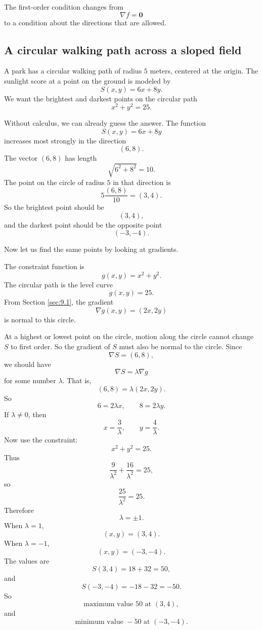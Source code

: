 The first-order condition changes from
\[
    \nabla f=\mathbf 0
\]
to a condition about the directions that are allowed.

\subsection{A circular walking path across a sloped field}

A park has a circular walking path of radius \(5\) meters, centered at the origin.  The
sunlight score at a point on the ground is modeled by
\[
    S(x,y)=6x+8y.
\]
We want the brightest and darkest points on the circular path
\[
    x^2+y^2=25.
\]

Without calculus, we can already guess the answer.  The function
\[
    S(x,y)=6x+8y
\]
increases most strongly in the direction
\[
    (6,8).
\]
The vector \((6,8)\) has length
\[
    \sqrt{6^2+8^2}=10.
\]
The point on the circle of radius \(5\) in that direction is
\[
    5\frac{(6,8)}{10}=(3,4).
\]
So the brightest point should be
\[
    (3,4),
\]
and the darkest point should be the opposite point
\[
    (-3,-4).
\]

Now let us find the same points by looking at gradients.

The constraint function is
\[
    g(x,y)=x^2+y^2.
\]
The circular path is the level curve
\[
    g(x,y)=25.
\]
From Section \ref{sec:9.1}, the gradient
\[
    \nabla g(x,y)=(2x,2y)
\]
is normal to this circle.

At a highest or lowest point on the circle, motion along the circle cannot change
\(S\) to first order.  So the gradient of \(S\) must also be normal to the circle.  Since
\[
    \nabla S=(6,8),
\]
we should have
\[
    \nabla S=\lambda \nabla g
\]
for some number \(\lambda\).  That is,
\[
    (6,8)=\lambda(2x,2y).
\]
So
\[
    6=2\lambda x,
    \qquad
    8=2\lambda y.
\]
If \(\lambda\ne0\), then
\[
    x=\frac{3}{\lambda},
    \qquad
    y=\frac{4}{\lambda}.
\]
Now use the constraint:
\[
    x^2+y^2=25.
\]
Thus
\[
    \frac{9}{\lambda^2}+\frac{16}{\lambda^2}=25,
\]
so
\[
    \frac{25}{\lambda^2}=25.
\]
Therefore
\[
    \lambda=\pm1.
\]
When \(\lambda=1\),
\[
    (x,y)=(3,4).
\]
When \(\lambda=-1\),
\[
    (x,y)=(-3,-4).
\]
The values are
\[
    S(3,4)=18+32=50,
\]
and
\[
    S(-3,-4)=-18-32=-50.
\]
So
\[
\boxed{
    \text{maximum value }50\text{ at }(3,4),
}
\]
and
\[
\boxed{
    \text{minimum value }-50\text{ at }(-3,-4).
}
\]

